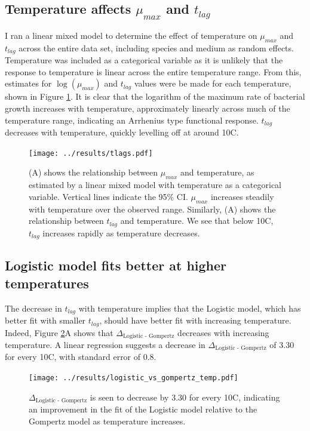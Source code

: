\documentclass[11pt, a4paper]{article}
\begin{document}
\begin{linenumbers}
        \subsection{Temperature affects $\mu_{max}$ and $t_{lag}$}
        
         I ran a linear mixed model to determine the effect of temperature on $\mu_{max}$ and $t_{lag}$ across the entire data set, including species and medium as random effects. Temperature was included as a categorical variable as it is unlikely that the response to temperature is linear across the entire temperature range. From this, estimates for $\log(\mu_{max})$ and $t_{lag}$ values were be made for each temperature, shown in Figure \ref{fig:params_temp}. It is clear that the logarithm of the maximum rate of bacterial growth increases with temperature, approximately linearly across much of the temperature range, indicating an Arrhenius type functional response. $t_{lag}$ decreases with temperature, quickly levelling off at around 10\degree C. 

         \begin{figure}[H]
        \texttt{[image: ../results/tlags.pdf]}
        \caption{(A) shows the relationship between $\mu_{max}$ and temperature, as estimated by a linear mixed model with temperature as a categorical variable. Vertical lines indicate the 95\% CI. $\mu_{max}$ increases steadily with temperature over the observed range. Similarly, (A) shows the relationship between $t_{lag}$ and temperature. We see that below 10\degree C, $t_{lag}$ increases rapidly as temperature decreases.   }
        \label{fig:params_temp}
        \end{figure}  



\subsection{Logistic model fits better at higher temperatures}

The decrease in $t_{lag}$ with temperature implies that the Logistic model, which has better fit with smaller $t_{lag}$, should have better fit with increasing temperature. Indeed, Figure \ref{fig:logistic_temp}A shows that $\Delta_{\text{Logistic - Gompertz}}$  decreases with increasing temperature. A linear regression suggests a decrease in $\Delta_{\text{Logistic - Gompertz}}$ of 3.30 for every 10\degree C, with standard error of 0.8.

        \begin{figure}[H]
        \centering
        \texttt{[image: ../results/logistic\_vs\_gompertz\_temp.pdf]}
        \caption{$\Delta_{\text{Logistic - Gompertz}}$ is seen to decrease by 3.30 for every 10\degree C, indicating an improvement in the fit of the Logistic model relative to the Gompertz model as temperature increases.}
        \label{fig:logistic_temp}
        \end{figure}  


\end{linenumbers}
\end{document}
